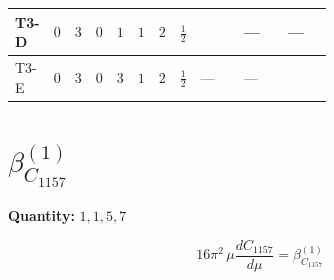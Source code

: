 \documentclass[8pt]{article}
\begin{document}
\begin{landscape}
\begin{longtable}{@{}llcccccc >{\raggedright\arraybackslash}p{0.21\linewidth} >{\raggedright\arraybackslash}p{0.21\linewidth} >{\raggedright\arraybackslash}p{0.21\linewidth}@{}}
\midrule
T3-D & $0$ & $3$ & $0$ & $1$ & $1$ & $2$ & $\frac{1}{2}$ & \scriptsize\adjustbox{max width=\linewidth}{$\begin{gathered} - \frac{2 \sqrt{3} lambdaT_{3} \overline{y_{1}} \overline{y_{2}}}{3 MF}\end{gathered}$} & --- & --- \\
\midrule
T3-E & $0$ & $3$ & $0$ & $3$ & $1$ & $2$ & $\frac{1}{2}$ & --- & --- & \scriptsize\adjustbox{max width=\linewidth}{$\begin{gathered} \frac{2 \sqrt{6} lambdaT_{3} \overline{y_{1}} \overline{y_{2}}}{3 MF}\end{gathered}$} \\
\midrule
\bottomrule
\end{longtable}
\clearpage
\section*{$\beta_{C_{1157}}^{(1)}$}
\noindent\textbf{Quantity: }$\mathrm{1,1,5,7}$\par\smallskip
\[16\pi^2\,\mu\frac{d C_{1157}}{d\mu}=\beta_{C_{1157}}^{(1)}\]

\end{landscape}
\end{document}
